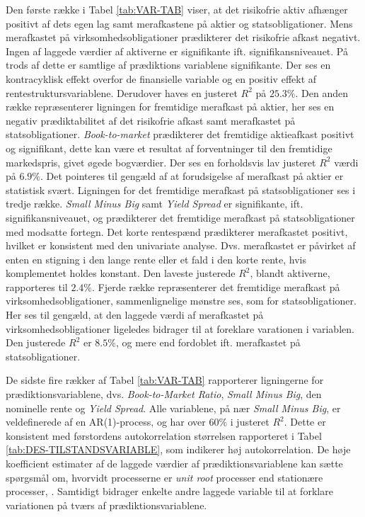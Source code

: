 \documentclass[
  a4paper,
  oneside]{memoir}
\begin{document}
Den første række i Tabel \ref{tab:VAR-TAB} viser, at det risikofrie aktiv afhænger positivt af dets egen lag samt merafkastene på aktier og statsobligationer. Mens merafkastet på virksomhedsobligationer prædikterer det risikofrie afkast negativt. Ingen af laggede værdier af aktiverne er signifikante ift. signifikansniveauet. På trods af dette er samtlige af prædiktions variablene signifikante. Der ses en kontracyklisk effekt overfor de finansielle variable og en positiv effekt af rentestruktursvariablene. Derudover haves en justeret \(R^2\) på \(25.3\%\). Den anden række repræsenterer ligningen for fremtidige merafkast på aktier, her ses en negativ prædiktabilitet af det risikofrie afkast samt merafkastet på statsobligationer. \emph{Book-to-market} prædikterer det fremtidige aktieafkast positivt og signifikant, dette kan være et resultat af forventninger til den fremtidige markedspris, givet øgede bogværdier. Der ses en forholdsvis lav justeret \(R^2\) værdi på \(6.9\%\). Det pointeres til gengæld af \citep{CampVicCha2003} at forudsigelse af merafkast på aktier er statistisk svært. Ligningen for det fremtidige merafkast på statsobligationer ses i tredje række. \emph{Small Minus Big} samt \emph{Yield Spread} er signifikante, ift. signifikansniveauet, og prædikterer det fremtidige merafkast på statsobligationer med modsatte fortegn. Det korte rentespænd prædikterer merafkastet positivt, hvilket er konsistent med den univariate analyse. Dvs. merafkastet er påvirket af enten en stigning i den lange rente eller et fald i den korte rente, hvis komplementet holdes konstant. Den laveste justerede \(R^2\), blandt aktiverne, rapporteres til \(2.4\%\). Fjerde række repræsenterer det fremtidige merafkast på virksomhedsobligationer, sammenlignelige mønstre ses, som for statsobligationer. Her ses til gengæld, at den laggede værdi af merafkastet på virksomhedsobligationer ligeledes bidrager til at foreklare varationen i variablen. Den justerede \(R^2\) er \(8.5\%\), og mere end fordoblet ift. merafkastet på statsobligationer.

De sidste fire rækker af Tabel \ref{tab:VAR-TAB} rapporterer ligningerne for prædiktionsvariablene, dvs. \emph{Book-to-Market Ratio}, \emph{Small Minus Big}, den nominelle rente og \emph{Yield Spread}. Alle variablene, på nær \emph{Small Minus Big}, er veldefinerede af en AR(1)-process, og har over \(60\%\) i justeret \(R^2\). Dette er konsistent med førstordens autokorrelation størrelsen rapporteret i Tabel \ref{tab:DES-TILSTANDSVARIABLE}, som indikerer høj autokorrelation. De høje koefficient estimater af de laggede værdier af prædiktionsvariablene kan sætte spørgsmål om, hvorvidt processerne er \emph{unit root} processer end stationære processer, \citep{JurVic2011}. Samtidigt bidrager enkelte andre laggede variable til at forklare variationen på tværs af prædiktionsvariablene.
\end{document}
